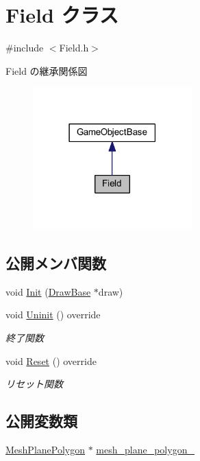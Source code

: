 \hypertarget{class_field}{}\section{Field クラス}
\label{class_field}


{\ttfamily \#include $<$Field.\+h$>$}



Field の継承関係図\nopagebreak
\begin{figure}[H]
\begin{center}
\leavevmode
\includegraphics[width=174pt]{class_field__inherit__graph}
\end{center}
\end{figure}
\subsection*{公開メンバ関数}
\begin{DoxyCompactItemize}
\item 
void \mbox{\hyperlink{class_field_a8360ab68eaf346984eab8bce4c37c3b3}{Init}} (\mbox{\hyperlink{class_draw_base}{Draw\+Base}} $\ast$draw)
\item 
void \mbox{\hyperlink{class_field_a6d1015e2409daa87cd00485ac1efc06b}{Uninit}} () override
\begin{DoxyCompactList}\small\item\em 終了関数 \end{DoxyCompactList}\item 
void \mbox{\hyperlink{class_field_a5b140074dcca821ac702da348238c6d4}{Reset}} () override
\begin{DoxyCompactList}\small\item\em リセット関数 \end{DoxyCompactList}\end{DoxyCompactItemize}
\subsection*{公開変数類}
\begin{DoxyCompactItemize}
\item 
\mbox{\hyperlink{class_mesh_plane_polygon}{Mesh\+Plane\+Polygon}} $\ast$ \mbox{\hyperlink{class_field_a5c4ad4d2fea2269e7ab2185cf09beb10}{mesh\+\_\+plane\+\_\+polygon\+\_\+}}
\end{DoxyCompactItemize}
